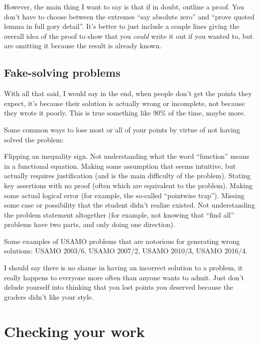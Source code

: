 \documentclass[11pt]{scrartcl}
\begin{document}
However, the main thing I want to say is that
\alert{if in doubt, outline a proof}.
You don't have to choose between the extremes
``say absolute zero'' and ``prove quoted lemma in full gory detail''.
It's better to just include a couple lines giving the overall idea of the proof
to show that you \emph{could} write it out if you wanted to,
but are omitting it because the result is already known.

\subsection{Fake-solving problems}
With all that said, I would say in the end,
when \alert{people don't get the points they expect,
it's because their solution is actually wrong or incomplete},
not because they wrote it poorly.
This is true something like 90\% of the time, maybe more.

Some common ways to lose most or all of your points
by virtue of not having solved the problem:
\begin{itemize}
  \ii Flipping an inequality sign.
  \ii Not understanding what the word ``function'' means
  in a functional equation.
  \ii Making some assumption that seems intuitive,
  but actually requires justification (and is the main difficulty of the problem).
  \ii Stating key assertions with no proof
  (often which are equivalent to the problem).
  \ii Making some actual logical error
  (for example, the so-called ``pointwise trap'').
  \ii Missing some case or possibility that the student didn't realize existed.
  \ii Not understanding the problem statement altogether
  (for example, not knowing that ``find all'' problems have two parts,
  and only doing one direction).
\end{itemize}
Some examples of USAMO problems that are notorious for generating wrong solutions:
USAMO 2003/6, USAMO 2007/2, USAMO 2010/3, USAMO 2016/4.

I should say there is no shame in having an incorrect solution to a problem,
it really happens to everyone more often than anyone wants to admit.
Just don't delude yourself into thinking that you lost points
you deserved because the graders didn't like your style.

\section{Checking your work}
\end{document}
